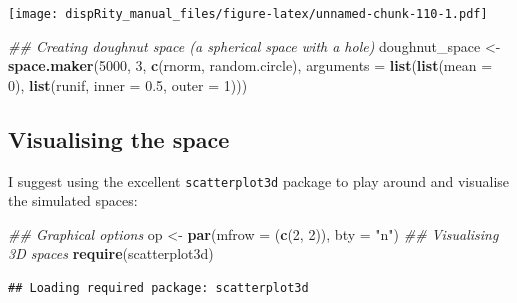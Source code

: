 \documentclass[]{book}
\newenvironment{Shaded}{\begin{snugshade}}{\end{snugshade}}
\newcommand{\CommentTok}[1]{\textcolor[rgb]{0.56,0.35,0.01}{\textit{#1}}}
\newcommand{\DataTypeTok}[1]{\textcolor[rgb]{0.13,0.29,0.53}{#1}}
\newcommand{\DecValTok}[1]{\textcolor[rgb]{0.00,0.00,0.81}{#1}}
\newcommand{\FloatTok}[1]{\textcolor[rgb]{0.00,0.00,0.81}{#1}}
\newcommand{\KeywordTok}[1]{\textcolor[rgb]{0.13,0.29,0.53}{\textbf{#1}}}
\newcommand{\NormalTok}[1]{#1}
\newcommand{\StringTok}[1]{\textcolor[rgb]{0.31,0.60,0.02}{#1}}
\begin{document}
\texttt{[image: dispRity\_manual\_files/figure-latex/unnamed-chunk-110-1.pdf]}

\begin{Shaded}
\begin{Highlighting}[]
\CommentTok{## Creating doughnut space (a spherical space with a hole)}
\NormalTok{doughnut_space <-}\StringTok{ }\KeywordTok{space.maker}\NormalTok{(}\DecValTok{5000}\NormalTok{, }\DecValTok{3}\NormalTok{, }\KeywordTok{c}\NormalTok{(rnorm, random.circle),}
     \DataTypeTok{arguments =} \KeywordTok{list}\NormalTok{(}\KeywordTok{list}\NormalTok{(}\DataTypeTok{mean =} \DecValTok{0}\NormalTok{),}
                      \KeywordTok{list}\NormalTok{(runif, }\DataTypeTok{inner =} \FloatTok{0.5}\NormalTok{, }\DataTypeTok{outer =} \DecValTok{1}\NormalTok{)))}
\end{Highlighting}
\end{Shaded}

\hypertarget{visualising-the-space}{%
\subsection{Visualising the space}\label{visualising-the-space}}

I suggest using the excellent \texttt{scatterplot3d} package to play around and visualise the simulated spaces:

\begin{Shaded}
\begin{Highlighting}[]
\CommentTok{## Graphical options}
\NormalTok{op <-}\StringTok{ }\KeywordTok{par}\NormalTok{(}\DataTypeTok{mfrow =}\NormalTok{ (}\KeywordTok{c}\NormalTok{(}\DecValTok{2}\NormalTok{, }\DecValTok{2}\NormalTok{)), }\DataTypeTok{bty =} \StringTok{"n"}\NormalTok{)}
\CommentTok{## Visualising 3D spaces}
\KeywordTok{require}\NormalTok{(scatterplot3d)}
\end{Highlighting}
\end{Shaded}

\begin{verbatim}
## Loading required package: scatterplot3d
\end{verbatim}
\end{document}
